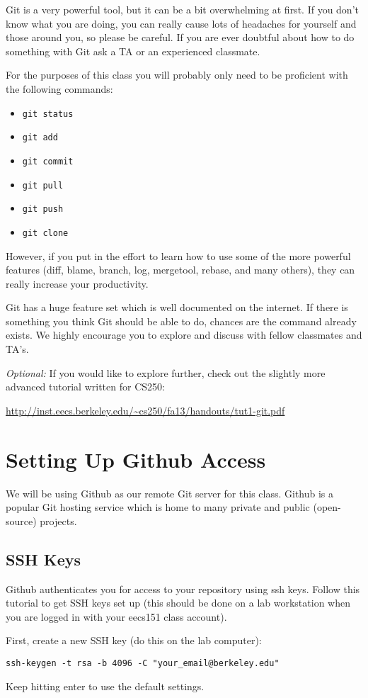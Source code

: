 \documentclass[11pt]{article}
\begin{document}
Git is a very powerful tool, but it can be a bit overwhelming at first. If you don't know what you are doing, you can really cause lots of headaches for yourself and those around you, so please be careful. If you are ever doubtful about how to do something with Git ask a TA or an experienced classmate.

For the purposes of this class you will probably only need to be proficient with the following commands:
\begin{itemize}
\item {\tt git status}
\item {\tt git add}
\item {\tt git commit}
\item {\tt git pull}
\item {\tt git push}
\item {\tt git clone}
\end{itemize}
However, if you put in the effort to learn how to use some of the more powerful features (diff, blame, branch, log, mergetool, rebase, and many others), they can really increase your productivity.

Git has a huge feature set which is well documented on the internet. If there is something you think Git should be able to do, chances are the command already exists. We highly encourage you to explore and discuss with fellow classmates and TA's.

\textit{Optional:} If you would like to explore further, check out the slightly more advanced tutorial written for CS250:

\url{http://inst.eecs.berkeley.edu/~cs250/fa13/handouts/tut1-git.pdf}

\section{Setting Up Github Access}
We will be using Github as our remote Git server for this class. Github is a popular Git hosting service which is home to many private and public (open-source) projects.

\subsection{SSH Keys}
Github authenticates you for access to your repository using ssh keys. Follow this tutorial to get SSH keys set up (this should be done on a lab workstation when you are logged in with your eecs151 class account).

First, create a new SSH key (do this on the lab computer):
\begin{verbatim}
ssh-keygen -t rsa -b 4096 -C "your_email@berkeley.edu"
\end{verbatim}
Keep hitting enter to use the default settings.
\end{document}
